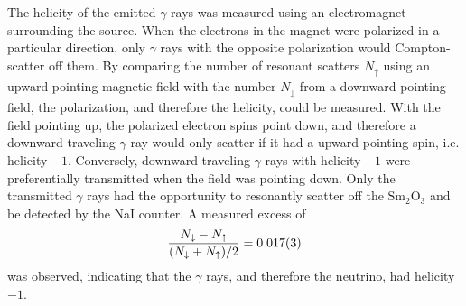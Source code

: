 The helicity of the emitted $\gamma$ rays was measured
using an electromagnet surrounding the  source.
When the electrons in the magnet were polarized in a particular direction,
only $\gamma$ rays with the opposite polarization
would Compton-scatter off them.
By comparing the number of resonant scatters $N_\uparrow$
using an upward-pointing magnetic field
with the number $N_\downarrow$ from a downward-pointing field,
the polarization, and therefore the helicity, could be measured.
With the field pointing up, the polarized electron spins point down,
and therefore a downward-traveling $\gamma$ ray
would only scatter if it had a upward-pointing spin, i.e. helicity $-1$.
Conversely, downward-traveling $\gamma$ rays
with helicity $-1$ were preferentially transmitted
when the field was pointing down.
Only the transmitted $\gamma$ rays had the opportunity to
resonantly scatter off the $\text{Sm}_2\text{O}_3$
and be detected by the NaI counter.
A measured excess of
\begin{equation}\label{eq:helicity_meas}
    \frac{N_{\downarrow}-N_{\uparrow}}{(N_{\downarrow}+N_{\uparrow})/2} =
    \num{0.017\pm0.003}
\end{equation}
was observed,
indicating that the $\gamma$ rays, and therefore the neutrino,
had helicity $-1$.


